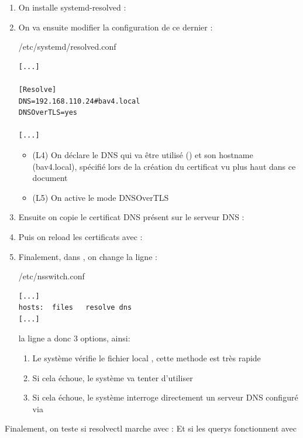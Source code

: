 \documentclass{article}
\begin{document}
\begin{enumerate}
	\item On installe systemd-resolved : 
	\item On va ensuite modifier la configuration de ce dernier :
\begin{configbox}{/etc/systemd/resolved.conf}
\begin{lstlisting}
[...]

[Resolve]
DNS=192.168.110.24#bav4.local
DNSOverTLS=yes

[...]
\end{lstlisting}
\end{configbox}
\begin{itemize}
	\item (L4) On déclare le DNS qui va être utilisé () et son hostname (bav4.local), spécifié lors de la création du certificat vu plus haut dans ce document
	\item (L5) On active le mode DNSOverTLS
\end{itemize}
	\item Ensuite on copie le certificat DNS  présent sur le serveur DNS :
	\item Puis on reload les certificats avec : 
	\item Finalement, dans , on change la ligne  :  
\begin{configbox}{/etc/nsswitch.conf}
\begin{lstlisting}
[...]
hosts:	files	resolve	dns
[...]
\end{lstlisting}
\end{configbox}
la ligne  a donc 3 options, ainsi:
\begin{enumerate}
	\item Le système vérifie le fichier local , cette methode est très rapide
	\item Si cela échoue, le système va tenter d'utiliser 
	\item Si cela échoue, le système interroge directement un serveur DNS configuré via 
\end{enumerate}
\end{enumerate}

Finalement, on teste si resolvectl marche avec :
Et si les querys fonctionnent avec 
\end{document}
